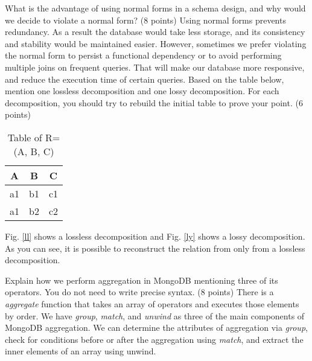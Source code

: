 \documentclass{homework}
\begin{document}
\question What is the advantage of using normal forms in a schema design, and why would we decide to violate a normal form? (8 points)
Using normal forms prevents redundancy. As a result the database would take less storage, and its consistency and stability would be maintained easier.
However, sometimes we prefer violating the normal form to persist a functional dependency or to avoid performing multiple joins on frequent queries. That will make our database more responsive, and reduce the execution time of certain queries.
\question Based on the table below, mention one lossless decomposition and one lossy decomposition. For each decomposition, you should try to rebuild the initial table to prove your point. (6 points) 
\begin{table}[!htp]
    \centering
    \begin{tabular}{|c|c|c|}
         \hline
         A & B & C\\
         \hline
         a1 & b1 & c1\\
         a1 & b2 & c2\\
         \hline
    \end{tabular}
    \caption{Table of R=(A, B, C)}
    \label{tab:my_label}
\end{table}
Fig. \ref{ll} shows a lossless decomposition and Fig. \ref{ly} shows a lossy decomposition.
As you can see, it is possible to reconstruct the relation from only from a lossless decomposition.

\question Explain how we perform aggregation in MongoDB mentioning three of its operators. You do not need to write precise syntax. (8 points)
There is a \textit{aggregate} function that takes an array of operators and executes those elements by order. We have \textit{group}, \textit{match}, and \textit{unwind} as three of the main components of MongoDB aggregation. We can determine the attributes of aggregation via \textit{group}, check for conditions before or after the aggregation using \textit{match}, and extract the inner elements of an array using unwind.
\end{document}
